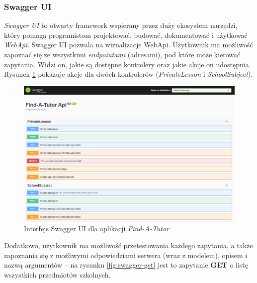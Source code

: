 \documentclass[12pt]{article}
\numberwithin{figure}{section}
\begin{document}
\begin{sloppypar}
\subsubsection{Swagger UI}
\textit{Swagger UI} to otwarty framework wspierany przez duży ekosystem narzędzi, który pomaga programistom projektować, budować, dokumentować i użytkować \textit{WebApi}. 
Swagger UI pozwala na wizualizacje WebApi. Użytkownik ma możliwość zapoznać się ze wszystkimi \textit{endpointami} (adresami), pod które może kierować zapytania. Widzi on, jakie są dostępne kontrolery oraz jakie akcje on udostępnia. Rysunek \ref{fig:swagger} pokazuje akcje dla dwóch kontrolerów (\textit{PrivateLesson} i \textit{SchoolSubject}). 
    
\begin{figure}[!htbp] 
    \centering
    \includegraphics[width=.96\textwidth]{images/chapter_3/swagger.png}
    \caption{Interfejs Swagger UI dla aplikacji \textit{Find-A-Tutor}}
    \label{fig:swagger}
\end{figure}
    
Dodatkowo, użytkownik ma możliwość przetestowania każdego zapytania, a także zapoznania się z możliwymi odpowiedziami serwera (wraz z modelem), opisem i nazwą argumentów -- na rysunku \ref{fig:swagger-get} jest to zapytanie \textbf{GET} o listę wszystkich przedmiotów szkolnych. 
    

\end{sloppypar}
\end{document}
